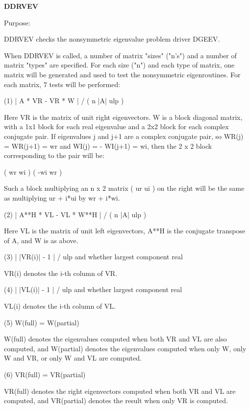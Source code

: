 {\bfseries D\+D\+R\+V\+E\+V} 

\begin{DoxyParagraph}{Purpose\+: }
\begin{DoxyVerb}    DDRVEV  checks the nonsymmetric eigenvalue problem driver DGEEV.

    When DDRVEV is called, a number of matrix "sizes" ("n's") and a
    number of matrix "types" are specified.  For each size ("n")
    and each type of matrix, one matrix will be generated and used
    to test the nonsymmetric eigenroutines.  For each matrix, 7
    tests will be performed:

    (1)     | A * VR - VR * W | / ( n |A| ulp )

      Here VR is the matrix of unit right eigenvectors.
      W is a block diagonal matrix, with a 1x1 block for each
      real eigenvalue and a 2x2 block for each complex conjugate
      pair.  If eigenvalues j and j+1 are a complex conjugate pair,
      so WR(j) = WR(j+1) = wr and WI(j) = - WI(j+1) = wi, then the
      2 x 2 block corresponding to the pair will be:

              (  wr  wi  )
              ( -wi  wr  )

      Such a block multiplying an n x 2 matrix  ( ur ui ) on the
      right will be the same as multiplying  ur + i*ui  by  wr + i*wi.

    (2)     | A**H * VL - VL * W**H | / ( n |A| ulp )

      Here VL is the matrix of unit left eigenvectors, A**H is the
      conjugate transpose of A, and W is as above.

    (3)     | |VR(i)| - 1 | / ulp and whether largest component real

      VR(i) denotes the i-th column of VR.

    (4)     | |VL(i)| - 1 | / ulp and whether largest component real

      VL(i) denotes the i-th column of VL.

    (5)     W(full) = W(partial)

      W(full) denotes the eigenvalues computed when both VR and VL
      are also computed, and W(partial) denotes the eigenvalues
      computed when only W, only W and VR, or only W and VL are
      computed.

    (6)     VR(full) = VR(partial)

      VR(full) denotes the right eigenvectors computed when both VR
      and VL are computed, and VR(partial) denotes the result
      when only VR is computed.


\end{DoxyVerb}
\end{DoxyParagraph}
